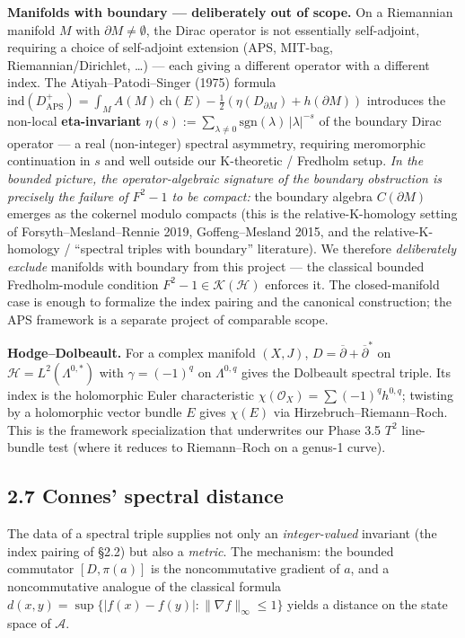 \documentclass[
  11pt,
]{article}
\begin{document}
\textbf{Manifolds with boundary --- deliberately out of scope.} On a
Riemannian manifold \(M\) with \(\partial M \neq \emptyset\), the Dirac
operator is not essentially self-adjoint, requiring a choice of
self-adjoint extension (APS, MIT-bag, Riemannian/Dirichlet, \ldots) ---
each giving a different operator with a different index. The
Atiyah--Patodi--Singer (1975) formula
\(\mathrm{ind}(D_{\mathrm{APS}}^+) = \int_M \widehat{A}(M)\,\mathrm{ch}(E) - \tfrac{1}{2}(\eta(D_{\partial M}) + h(\partial M))\)
introduces the non-local \textbf{eta-invariant}
\(\eta(s) := \sum_{\lambda \neq 0} \mathrm{sgn}(\lambda)\,|\lambda|^{-s}\)
of the boundary Dirac operator --- a real (non-integer) spectral
asymmetry, requiring meromorphic continuation in \(s\) and well outside
our K-theoretic / Fredholm setup. \emph{In the bounded picture, the
operator-algebraic signature of the boundary obstruction is precisely
the failure of \(F^2 - 1\) to be compact:} the boundary algebra
\(C(\partial M)\) emerges as the cokernel modulo compacts (this is the
relative-K-homology setting of Forsyth--Mesland--Rennie 2019,
Goffeng--Mesland 2015, and the relative-K-homology / ``spectral triples
with boundary'' literature). We therefore \emph{deliberately exclude}
manifolds with boundary from this project --- the classical bounded
Fredholm-module condition \(F^2-1\in\mathcal{K}(\mathcal{H})\) enforces it. The
closed-manifold case is enough to formalize the index pairing and the
canonical construction; the APS framework is a separate project of
comparable scope.

\textbf{Hodge--Dolbeault.} For a complex manifold \((X, J)\),
\(D = \overline{\partial} + \overline{\partial}^*\) on
\(\mathcal{H}= L^2(\Lambda^{0,*})\) with \(\gamma = (-1)^{q}\) on
\(\Lambda^{0,q}\) gives the Dolbeault spectral triple. Its index is the
holomorphic Euler characteristic
\(\chi(\mathcal{O}_X) = \sum (-1)^q h^{0,q}\); twisting by a holomorphic
vector bundle \(E\) gives \(\chi(E)\) via Hirzebruch--Riemann--Roch.
This is the framework specialization that underwrites our Phase 3.5
\(T^2\) line-bundle test (where it reduces to Riemann--Roch on a genus-1
curve).

\subsection{2.7 Connes' spectral
distance}\label{connes-spectral-distance}

The data of a spectral triple supplies not only an \emph{integer-valued}
invariant (the index pairing of §2.2) but also a \emph{metric}. The
mechanism: the bounded commutator \([D, \pi(a)]\) is the noncommutative
gradient of \(a\), and a noncommutative analogue of the classical
formula \(d(x, y) = \sup\{|f(x) - f(y)| : \|\nabla f\|_\infty \leq 1\}\)
yields a distance on the state space of \(\mathcal{A}\).
\end{document}
